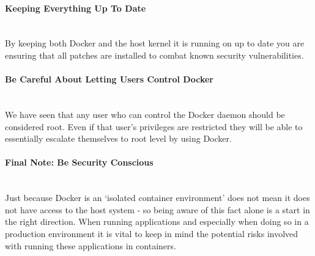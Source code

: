 \documentclass{article}
\begin{document}
\paragraph{Keeping Everything Up To Date}\mbox{}\\
By keeping both Docker and the host kernel it is running on up to date you are ensuring that all patches are installed to combat known security vulnerabilities.

\paragraph{Be Careful About Letting Users Control Docker}\mbox{}\\
We have seen that any user who can control the Docker daemon should be considered root. Even if that user's privileges are restricted they will be able to essentially escalate themselves to root level by using Docker.

\paragraph{Final Note: Be Security Conscious}\mbox{}\\
Just because Docker is an `isolated container environment' does not mean it does not have access to the host system - so being aware of this fact alone is a start in the right direction. When running applications and especially when doing so in a production environment it is vital to keep in mind the potential risks involved with running these applications in containers.

\newpage

\end{document}
